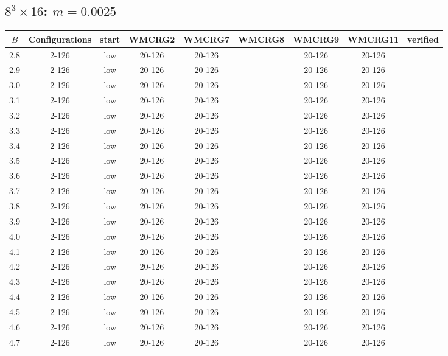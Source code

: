 \documentclass{article}
\begin{document}
\begin{center}
  \section*{$8^3\times16$:  $m=0.0025$}
    \begin{center}
    \begin{tabular}{| c | c | c | c | c | c | c | c | c |}
      \hline
      $B$ & Configurations & start & WMCRG2 & WMCRG7 & WMCRG8 & WMCRG9 & WMCRG11 & verified\\
      \hline
      2.8 & 2-126 & low & 20-126 & 20-126 &  & 20-126 & 20-126 &\\
      2.9 & 2-126 & low & 20-126 & 20-126 &  & 20-126 & 20-126 &\\
      3.0 & 2-126 & low & 20-126 & 20-126 &  & 20-126 & 20-126 &\\
      3.1 & 2-126 & low & 20-126 & 20-126 &  & 20-126 & 20-126 &\\
      3.2 & 2-126 & low & 20-126 & 20-126 &  & 20-126 & 20-126 &\\
      3.3 & 2-126 & low & 20-126 & 20-126 &  & 20-126 & 20-126 &\\
      3.4 & 2-126 & low & 20-126 & 20-126 &  & 20-126 & 20-126 &\\
      3.5 & 2-126 & low & 20-126 & 20-126 &  & 20-126 & 20-126 &\\
      3.6 & 2-126 & low & 20-126 & 20-126 &  & 20-126 & 20-126 &\\
      3.7 & 2-126 & low & 20-126 & 20-126 &  & 20-126 & 20-126 &\\
      3.8 & 2-126 & low & 20-126 & 20-126 &  & 20-126 & 20-126 &\\
      3.9 & 2-126 & low & 20-126 & 20-126 &  & 20-126 & 20-126 &\\
      4.0 & 2-126 & low & 20-126 & 20-126 &  & 20-126 & 20-126 &\\
      4.1 & 2-126 & low & 20-126 & 20-126 &  & 20-126 & 20-126 &\\
      4.2 & 2-126 & low & 20-126 & 20-126 &  & 20-126 & 20-126 &\\
      4.3 & 2-126 & low & 20-126 & 20-126 &  & 20-126 & 20-126 &\\
      4.4 & 2-126 & low & 20-126 & 20-126 &  & 20-126 & 20-126 &\\
      4.5 & 2-126 & low & 20-126 & 20-126 &  & 20-126 & 20-126 &\\
      4.6 & 2-126 & low & 20-126 & 20-126 &  & 20-126 & 20-126 &\\
      4.7 & 2-126 & low & 20-126 & 20-126 &  & 20-126 & 20-126 &\\

\end{tabular}
\end{center}
\end{center}
\end{document}
